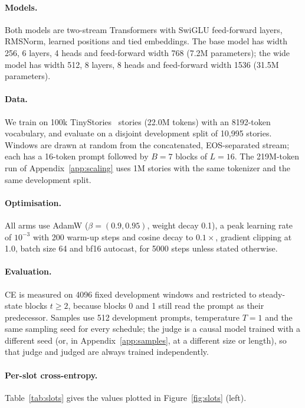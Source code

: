 \documentclass{article}
\theoremstyle{definition}
\theoremstyle{remark}
\begin{document}
\paragraph{Models.}
Both models are two-stream Transformers with SwiGLU feed-forward layers, RMSNorm, learned positions and tied embeddings.
The base model has width 256, 6 layers, 4 heads and feed-forward width 768 (7.2M parameters); the wide model has width 512, 8 layers, 8 heads and feed-forward width 1536 (31.5M parameters).

\paragraph{Data.}
We train on 100k TinyStories~\citep{eldan2023tinystories} stories (22.0M tokens) with an 8192-token vocabulary, and evaluate on a disjoint development split of 10{,}995 stories.
Windows are drawn at random from the concatenated, EOS-separated stream; each has a 16-token prompt followed by $B=7$ blocks of $L=16$.
The 219M-token run of Appendix~\ref{app:scaling} uses 1M stories with the same tokenizer and the same development split.

\paragraph{Optimisation.}
All arms use AdamW ($\beta=(0.9,0.95)$, weight decay 0.1), a peak learning rate of $10^{-3}$ with 200 warm-up steps and cosine decay to $0.1\times$, gradient clipping at 1.0, batch size 64 and bf16 autocast, for 5000 steps unless stated otherwise.

\paragraph{Evaluation.}
CE is measured on 4096 fixed development windows and restricted to steady-state blocks $t\ge2$, because blocks 0 and 1 still read the prompt as their predecessor.
Samples use 512 development prompts, temperature $T=1$ and the same sampling seed for every schedule; the judge is a causal model trained with a different seed (or, in Appendix~\ref{app:samples}, at a different size or length), so that judge and judged are always trained independently.

\paragraph{Per-slot cross-entropy.}
\label{app:slots}
Table~\ref{tab:slots} gives the values plotted in Figure~\ref{fig:slots} (left).
\end{document}
